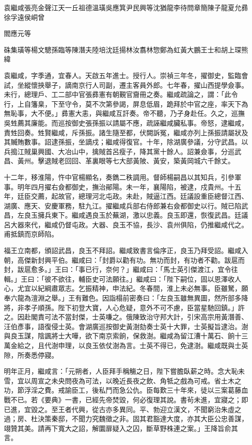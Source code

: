 
\begin{pinyinscope}
袁繼咸張亮金聲江天一丘祖德溫璜吳應箕尹民興等沈猶龍李待問章簡陳子龍夏允彞徐孚遠侯峒曾{{閻應元等

硃集璜等楊文驄孫臨等陳潛夫陸培沈廷揚林汝翥林惣鄭為虹黃大鵬王士和胡上琛熊緯

袁繼咸，字季通，宜春人。天啟五年進士。授行人。崇禎三年冬，擢御史，監臨會試，坐縱懷挾舉子，謫南京行人司副，遷主客員外郎。七年春，擢山西提學僉事。未行，總理戶、工二部中官張彞憲有朝覲官齎冊之奏。繼咸疏論之，謂：「此令行，上自籓臬，下至守令，莫不次第參謁，屏息低眉，跪拜於中官之座，率天下為無恥事，大不便。」彞憲大恚，與繼咸互訐奏。帝不聽，乃孑身赴任。久之，巡撫吳甡薦其廉能。而巡按御史張孫振以請屬不應，疏誣繼咸臟私事。帝怒，逮繼咸，責甡回奏。甡賢繼咸，斥孫振。諸生隨至都，伏闕訴冤，繼咸亦列上孫振請屬狀及其贓賄數事。詔逮孫振，坐謫戍；繼咸得復官。十年，除湖廣參議，分守武昌。以兵搗江賊巢興國、大冶山中，擒賊首呂瘦子，降其黨十餘人。詔兼僉事，分巡武昌、黃州。擊退賊老回回、革裏眼等七大部黃陂、黃安，築黃岡城六千餘丈。

十二年，移淮陽，忤中官楊顯名，奏鐫二秩調用。督師楊嗣昌以其知兵，引參軍事。明年四月擢右僉都御史，撫治鄖陽。未一年，襄陽陷，被逮，戍貴州。十五年，廷臣交薦，起故官，總理河北屯政。未赴，賊逼江西。廷議設重臣總督江西、湖廣、應天、安慶軍務，駐九江。擢繼咸兵部右侍郎兼右僉都御史以行。賊已陷武昌，左良玉擁兵東下。繼咸遇良玉於蕪湖，激以忠義。良玉即還，恢復武昌。廷議呂大器來代，繼咸仍督屯政。大器、良玉不協，長沙、袁州俱陷，仍推繼咸代之。甫抵鎮而京師陷。

福王立南都，頒詔武昌，良玉不拜詔。繼咸致書言倫序正，良玉乃拜受詔。繼咸入朝，高傑新封興平伯。繼咸曰：「封爵以勸有功。無功而封，有功者不勸。跋扈而封，跋扈愈多。」王曰：「事已行，奈何？」繼咸曰：「馬士英引傑渡江，宜令往輯。」王曰：「彼不欲往，輔臣史可法願往。」繼咸曰：「陛下嗣位，固以恩澤收人心，尤宜以紀綱肅眾志。乞振精神，申法紀。冬春間，淮上未必無事。臣雖駑，願奉六龍為澶淵之舉。」王有難色。因詣榻前密奏曰：「左良玉雖無異圖，然所部多降將，非孝子順孫。陛下初登大寶，人心危疑，意外不可不慮，臣當星馳回鎮。」許之。因赴閣責可法不當封傑，士英嗛之。俄陳致治守邦大計，引宋高宗用黃潛善、汪伯彥事，語復侵士英。會湖廣巡按御史黃澍劾奏士英十大罪，士英擬旨逮治。澍與良玉謀，陰諷將士大嘩，欲下南京索餉，保救澍。繼咸為留江漕十萬石、餉十三萬金給之，且代澍申理，以良玉依仗澍為言。士英不得已，免逮澍。繼咸既與士英隙，所奏悉停寢。

明年正月，繼咸言：「元朔者，人臣拜手稱觴之日，陛下嘗膽臥薪之時。念大恥未雪，宜以周宣之未央問夜為可法，以晚近長夜之飲、角牴之戲為可戒。省土木之功，節浮淫之費。戒諭臣工，後私鬥而急公仇。臣每歎三十年來，徒以三案葛藤血戰不已。若《要典》一書，已經先帝焚毀，何必復理其說。書茍未進，宜寢之；即已進，宜毀之。至王者代興，從古亦多異同。平、勃迎立漢文，不聞窮治朱虛之過；房、杜決策秦邸，不聞力究魏徵之非。固其君豁達大度，亦其大臣公忠善謀，翊贊其美。請再下寬大之詔，解圜扉疑入之囚，斷草野株連之案。」王降旨俞其言。

}}
\end{pinyinscope}
